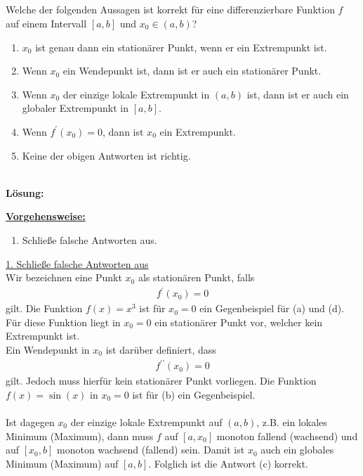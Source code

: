 \subsection*{}
Welche der folgenden Aussagen ist korrekt für eine differenzierbare Funktion $f$ auf einem Intervall $[a,b]$ und $x_0 \in (a,b)$?
\renewcommand{\labelenumi}{(\alph{enumi})}
\begin{enumerate}
	\item 
	$x_0$ ist genau dann ein stationärer Punkt, wenn er ein Extrempunkt ist.
	\item
	Wenn $x_0$ ein Wendepunkt ist, dann ist er auch ein stationärer Punkt.
	\item
	Wenn $x_0$ der einzige lokale Extrempunkt in $(a,b)$ ist, dann ist er auch ein globaler Extrempunkt in $[a,b]$.
	\item
	Wenn $f^\prime(x_0) = 0$, dann ist $x_0$ ein Extrempunkt.
	\item
	Keine der obigen Antworten ist richtig.
\end{enumerate}
\ \\
\textbf{Lösung:}
\begin{mdframed}
\underline{\textbf{Vorgehensweise:}}
\renewcommand{\labelenumi}{\theenumi.}
\begin{enumerate}
\item Schließe falsche Antworten aus.
\end{enumerate}
\end{mdframed}

\underline{1. Schließe falsche Antworten aus}\\
Wir bezeichnen eine Punkt $x_0$ als stationären Punkt, falls 
\begin{align*}
	f^\prime(x_0) = 0
\end{align*}
gilt. Die Funktion $f(x) = x^3$ ist für $x_0 = 0$ ein Gegenbeispiel für (a) und (d). Für diese Funktion liegt in $x_0 = 0$ ein stationärer Punkt vor, welcher kein Extrempunkt ist.\\
Ein Wendepunkt in $x_0 $ ist darüber definiert, dass 
\begin{align*}
	f^{\prime \prime}(x_0)
	=
	0
\end{align*}
gilt. Jedoch muss hierfür kein stationärer Punkt vorliegen. Die Funktion $f(x) = \sin(x)$ in $x_0 = 0$ ist für (b) ein Gegenbeispiel.\\
\\
Ist dagegen $x_0$ der einzige lokale Extrempunkt auf $(a,b)$, z.B. ein lokales Minimum (Maximum), dann muss $f$ auf $[a,x_0]$ monoton fallend (wachsend) und auf $[x_0,b]$ monoton wachsend (fallend) sein. Damit ist $x_0$ auch ein globales Minimum (Maximum) auf $[a,b]$. Folglich ist die Antwort (c) korrekt.
\newpage

